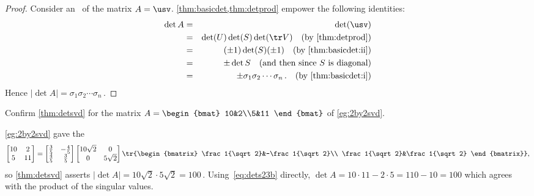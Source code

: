 \begin{proof} 
Consider an \svd\ of the matrix \(A=\usv\).
\cref{thm:basicdet,thm:detprod} empower the following identities:
\begin{eqnarray*}
\det A&=&\det(\usv)
\\&=&\det(U)\det(S)\det(\tr V)
\quad(\text{by \cref{thm:detprod}})
\\&=&(\pm 1)\det(S)(\pm 1)
\quad(\text{by \cref{thm:basicdet:ii}})
\\&=&\pm \det S
\quad(\text{and then since \(S\) is diagonal})
\\&=&\pm \sigma_1\sigma_2\cdots\sigma_n\,.
\quad(\text{by \cref{thm:basicdet:i}})
\end{eqnarray*}
Hence \(|\det A|=\sigma_1\sigma_2\cdots\sigma_n\)\,.
\end{proof}

\begin{example} 
Confirm \cref{thm:detsvd} for the matrix \(A=\begin{bmat} 10&2\\5&11 \end{bmat}\) of \cref{eg:2by2svd}.
\begin{solution} 
\cref{eg:2by2svd} gave the \svd
\begin{equation*}
\begin{bmatrix} 10&2\\5&11 \end{bmatrix}=
\begin{bmatrix} \frac35&-\frac45\\\frac45&\frac35 \end{bmatrix}
\begin{bmatrix} 10\sqrt2&0\\0&5\sqrt2 \end{bmatrix}
\tr{\begin{bmatrix} \frac1{\sqrt2}&-\frac1{\sqrt2}\\ \frac1{\sqrt2}&\frac1{\sqrt2} \end{bmatrix}},
\end{equation*}
so \cref{thm:detsvd} asserts \(|\det A|=10\sqrt2\cdot5\sqrt 2=100\)\,.
Using~\eqref{eq:dets23b} directly, \(\det A=10\cdot11-2\cdot 5=110-10=100\) which agrees with the product of the singular values.
\end{solution}
\end{example}






